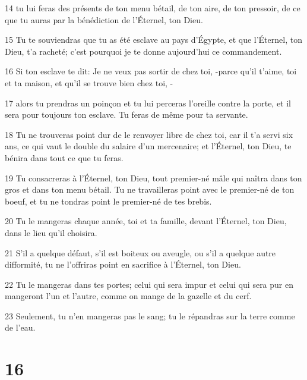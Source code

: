\par 14 tu lui feras des présents de ton menu bétail, de ton aire, de ton pressoir, de ce que tu auras par la bénédiction de l'Éternel, ton Dieu.
\par 15 Tu te souviendras que tu as été esclave au pays d'Égypte, et que l'Éternel, ton Dieu, t'a racheté; c'est pourquoi je te donne aujourd'hui ce commandement.
\par 16 Si ton esclave te dit: Je ne veux pas sortir de chez toi, -parce qu'il t'aime, toi et ta maison, et qu'il se trouve bien chez toi, -
\par 17 alors tu prendras un poinçon et tu lui perceras l'oreille contre la porte, et il sera pour toujours ton esclave. Tu feras de même pour ta servante.
\par 18 Tu ne trouveras point dur de le renvoyer libre de chez toi, car il t'a servi six ans, ce qui vaut le double du salaire d'un mercenaire; et l'Éternel, ton Dieu, te bénira dans tout ce que tu feras.
\par 19 Tu consacreras à l'Éternel, ton Dieu, tout premier-né mâle qui naîtra dans ton gros et dans ton menu bétail. Tu ne travailleras point avec le premier-né de ton boeuf, et tu ne tondras point le premier-né de tes brebis.
\par 20 Tu le mangeras chaque année, toi et ta famille, devant l'Éternel, ton Dieu, dans le lieu qu'il choisira.
\par 21 S'il a quelque défaut, s'il est boiteux ou aveugle, ou s'il a quelque autre difformité, tu ne l'offriras point en sacrifice à l'Éternel, ton Dieu.
\par 22 Tu le mangeras dans tes portes; celui qui sera impur et celui qui sera pur en mangeront l'un et l'autre, comme on mange de la gazelle et du cerf.
\par 23 Seulement, tu n'en mangeras pas le sang; tu le répandras sur la terre comme de l'eau.

\chapter{16}

